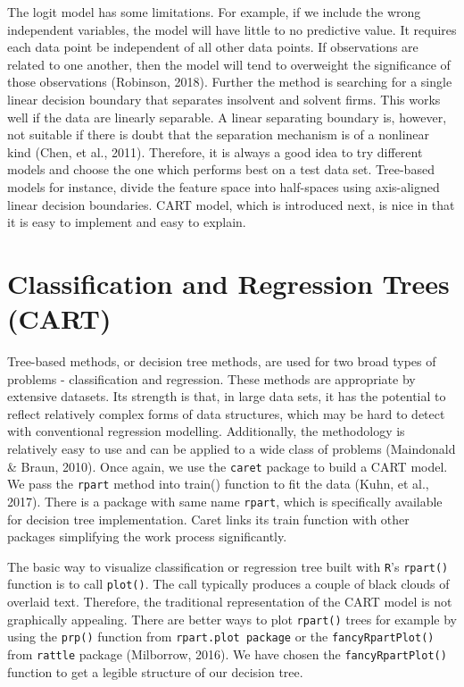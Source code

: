 \documentclass{article}
\begin{document}
The logit model has some limitations. For example, if we include the wrong independent variables, the model will have little to no predictive value. It requires each data point be independent of all other data points. If observations are related to one another, then the model will tend to overweight the significance of those 
observations (Robinson, 2018). Further the method is searching for a single linear decision boundary that separates insolvent and solvent firms. This works well if the data are linearly separable. A linear separating boundary is, however, not suitable if there is doubt that the separation mechanism is of a nonlinear 
kind (Chen, et al., 2011). Therefore, it is always a good idea to try different models and choose the one which performs best on a test data set. 
Tree-based models for instance, divide the feature space into half-spaces using axis-aligned linear decision boundaries. CART model, which is introduced next, is nice in that it is easy to implement and easy to explain. 


\section{Classification and Regression Trees (CART)}

Tree-based methods, or decision tree methods, are used for two broad types of problems - classification and regression. These methods are appropriate by extensive datasets. Its strength is that, in large data sets, it has the potential to reflect relatively complex forms of data structures, which may be hard to detect with 
conventional regression modelling. Additionally, the methodology is relatively easy to use and can be applied to a wide class of problems (Maindonald \& Braun, 2010).
Once again, we use the \texttt{caret} package to build a CART model. We pass the \texttt{rpart} method into train() function to fit the data (Kuhn, et al., 2017). There is a package with same name \texttt{rpart}, which is specifically available for decision tree implementation. Caret links its train function with other packages simplifying the work process significantly. 



The basic way to visualize classification or regression tree built with \texttt{R}'s \texttt{rpart()} function is to call \texttt{plot()}. The call typically produces a couple of black clouds of overlaid text. Therefore, the traditional representation of the CART model is not graphically appealing. There are better ways to plot \texttt{rpart()} trees for example by using the \texttt{prp()} function from \texttt{rpart.plot package} or the \texttt{fancyRpartPlot()} from \texttt{rattle} package (Milborrow, 2016). We have chosen the \texttt{fancyRpartPlot()} function to get a legible structure of our decision tree.
\end{document}
